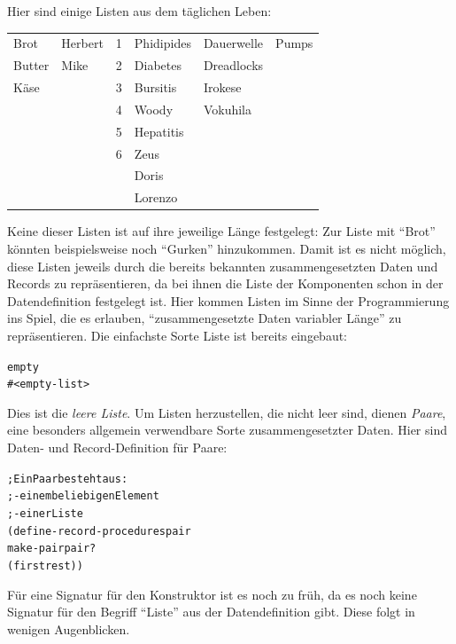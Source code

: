 Hier sind einige Listen aus dem täglichen Leben:
%
\begin{center}
  \begin{tabular}{l@{\qquad}l@{\qquad}l@{\qquad}l@{\qquad}l@{\qquad}l}
  Brot & Herbert & 1 & Phidipides & Dauerwelle & Pumps \\
  Butter & Mike & 2 & Diabetes & Dreadlocks \\
  Käse & & 3 & Bursitis & Irokese \\
  & & 4 & Woody & Vokuhila \\
  && 5 & Hepatitis \\
  && 6 & Zeus \\
  &&& Doris\\
  &&& Lorenzo
\end{tabular}
\end{center}
%
Keine dieser Listen ist auf ihre jeweilige Länge festgelegt: Zur Liste
mit "`Brot"' könnten beispielsweise noch "`Gurken"' hinzukommen.  Damit ist es
nicht möglich, diese Listen jeweils durch die bereits bekannten
zusammengesetzten Daten und Records zu repräsentieren, da bei ihnen
die Liste der Komponenten schon in der Datendefinition festgelegt
ist.  Hier kommen Listen im Sinne der Programmierung ins Spiel, die es
erlauben, "`zusammengesetzte Daten variabler Länge"' zu
repräsentieren.  Die einfachste Sorte Liste ist bereits eingebaut:
%
\begin{alltt}
empty
\evalsto{} #<empty-list>
\end{alltt}
%
Dies ist die \textit{leere Liste}.  Um Listen herzustellen, die nicht leer
sind, dienen \textit{Paare}, eine besonders allgemein
verwendbare Sorte zusammengesetzter Daten.  Hier sind Daten- und
Record-Definition für Paare:\label{def:pair}
%
\begin{alltt}
; Ein Paar besteht aus:
; - einem beliebigen Element
; - einer Liste
(define-record-procedures pair
  make-pair pair?
  (first rest))
\end{alltt}
%
Für eine Signatur für den Konstruktor ist es noch zu früh, da es noch
keine Signatur für den Begriff "`Liste"' aus der Datendefinition
gibt.  Diese folgt in wenigen Augenblicken.

